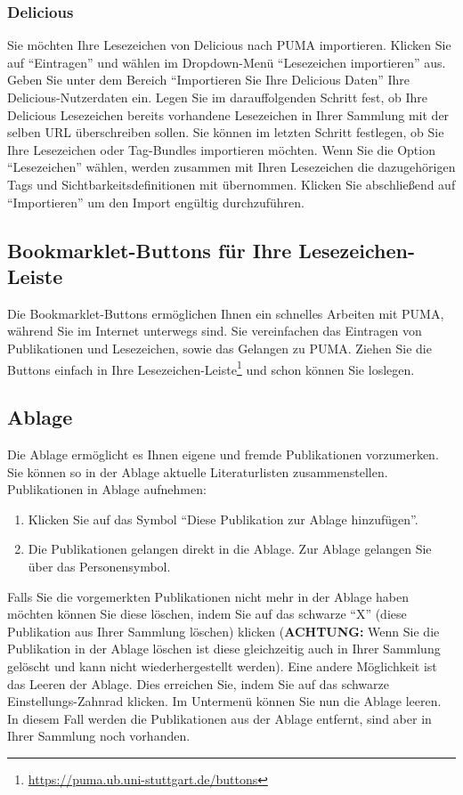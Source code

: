 \documentclass[a4paper,11pt,twoside]{scrbook}
\begin{document}
\subsubsection{Delicious}
Sie möchten Ihre Lesezeichen von Delicious nach PUMA importieren. Klicken Sie auf \enquote{Eintragen} und wählen im Dropdown-Menü \enquote{Lesezeichen importieren} aus. Geben Sie unter dem Bereich \enquote{Importieren Sie Ihre Delicious Daten} Ihre Delicious-Nutzerdaten ein. \newline
Legen Sie im darauffolgenden Schritt fest, ob Ihre Delicious Lesezeichen bereits vorhandene Lesezeichen in Ihrer Sammlung mit der selben URL überschreiben sollen.\newline
Sie können im letzten Schritt festlegen, ob Sie Ihre Lesezeichen oder Tag-Bundles importieren möchten. Wenn Sie die Option \enquote{Lesezeichen} wählen, werden zusammen mit Ihren Lesezeichen die dazugehörigen Tags und Sichtbarkeitsdefinitionen mit übernommen.
\newline Klicken Sie abschließend auf \enquote{Importieren} um den Import engültig durchzuführen.
  
\subsection{Bookmarklet-Buttons für Ihre Lesezeichen-Leiste}
Die Bookmarklet-Buttons ermöglichen Ihnen ein schnelles Arbeiten mit PUMA, während Sie im Internet unterwegs sind. Sie vereinfachen das Eintragen von Publikationen und Lesezeichen, sowie das Gelangen zu PUMA. Ziehen Sie die Buttons einfach in Ihre Lesezeichen-Leiste\footnote{\url{https://puma.ub.uni-stuttgart.de/buttons}} und schon können Sie loslegen.

\hypertarget{Ablage}{\subsection{Ablage}}
Die Ablage ermöglicht es Ihnen eigene und fremde Publikationen vorzumerken. Sie können so in der Ablage aktuelle Literaturlisten zusammenstellen.
\newline
Publikationen in Ablage aufnehmen: %
\begin{enumerate}
    \item Klicken Sie auf das Symbol \enquote{Diese Publikation zur Ablage hinzufügen}.
    \item Die Publikationen gelangen direkt in die Ablage. Zur Ablage gelangen Sie über das Personensymbol.
\end{enumerate}
Falls Sie die vorgemerkten Publikationen nicht mehr in der Ablage haben möchten können Sie diese löschen, indem Sie auf das schwarze \enquote{X} (diese Publikation aus Ihrer Sammlung löschen) klicken (\textbf{ACHTUNG:} Wenn Sie die Publikation in der Ablage löschen ist diese gleichzeitig auch in Ihrer Sammlung gelöscht und kann nicht wiederhergestellt werden).
Eine andere Möglichkeit ist das Leeren der Ablage. Dies erreichen Sie, indem Sie auf das schwarze Einstellungs-Zahnrad klicken. Im Untermenü können Sie nun die Ablage leeren. In diesem Fall werden die Publikationen aus der Ablage entfernt, sind aber in Ihrer Sammlung noch vorhanden.
\end{document}
